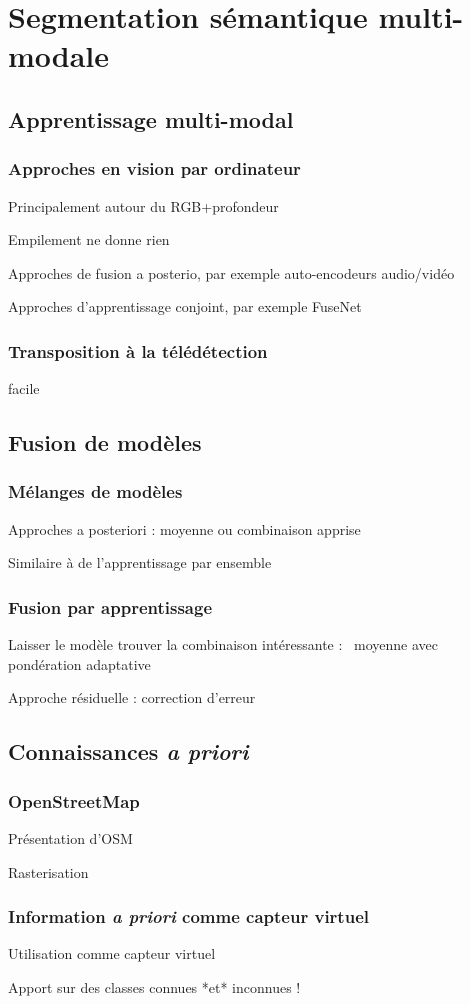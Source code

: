 \chapter{Segmentation sémantique multi-modale}

\section{Apprentissage multi-modal}

\subsection{Approches en vision par ordinateur}

Principalement autour du RGB+profondeur

Empilement ne donne rien

Approches de fusion a posterio, par exemple auto-encodeurs audio/vidéo

Approches d'apprentissage conjoint, par exemple FuseNet

\subsection{Transposition à la télédétection}

facile

\section{Fusion de modèles}

\subsection{Mélanges de modèles}

Approches a posteriori : moyenne ou combinaison apprise

Similaire à de l'apprentissage par ensemble

\subsection{Fusion par apprentissage}

Laisser le modèle trouver la combinaison intéressante : ~moyenne avec pondération adaptative

Approche résiduelle : correction d'erreur

\section{Connaissances \textit{a priori}}

\subsection{OpenStreetMap}

Présentation d'OSM

Rasterisation

\subsection{Information \textit{a priori} comme capteur virtuel}

Utilisation comme capteur virtuel

Apport sur des classes connues *et* inconnues !
